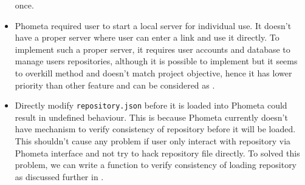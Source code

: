 \documentclass[master.tex]{subfiles}
\begin{document}
\begin{itemize}
  once.
\item Phometa required user to start a local server for individual use. It
  doesn't have a proper server where user can enter a link and use it directly.
  To implement such a proper server, it requires user accounts and database to
  manage users repositories, although it is possible to implement but it seems
  to overkill method and doesn't match project objective, hence it has lower
  priority than other feature and can be considered as \hrefFutureWork.
\item Directly modify \texttt{repository.json} before it is loaded into Phometa
  could result in undefined behaviour. This is because Phometa currently doesn't
  have mechanism to verify consistency of repository before it will be loaded.
  This shouldn't cause any problem if user only interact with repository via
  Phometa interface and not try to hack repository file directly. To solved this
  problem, we can write a function to verify consistency of loading repository
  as discussed further in \hrefFutureWork.
\end{itemize}
\end{document}
